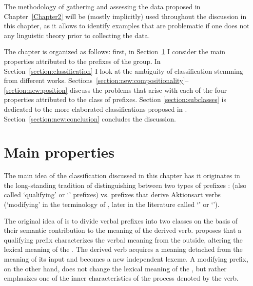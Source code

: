  The methodology of gathering and assessing the data proposed in Chapter~\ref{Chapter2} will be (mostly implicitly) used throughout the discussion in this chapter, as it allows to identify examples that are problematic if one does not  any linguistic theory prior to collecting the data.

The chapter is organized as follows: first, in Section~\ref{section:properties} I consider the main properties attributed to the prefixes of the  group. In Section~\ref{section:classification} I look at the ambiguity of classification stemming from different works. Sections~\ref{section:new:compositionality}--\ref{section:new:position} discuss the problems that arise with each of the four properties attributed to the class of  prefixes. Section \ref{section:subclasses} is dedicated to the more elaborated classifications proposed in \citet{Tatevosov:07,Tatevosov:09}. Section~\ref{section:new:conclusion} concludes the discussion.
\section{Main properties}\label{section:properties}
The main idea of the classification discussed in this chapter has it originates in the long-standing tradition of distinguishing between two types of prefixes \citep{Isachenko:60, Forsyth:70, Townsend:75}:  (also called `qualifying' or `' prefixes) vs. prefixes that derive Aktionsart verbs (`modifying' in the terminology of \citeauthor{Isachenko:60}, later in the literature called `' or `').

The original idea of \citet[222--224]{Isachenko:60} is to divide verbal prefixes into two classes on the basis of their semantic contribution to the meaning of the derived verb. \citeauthor{Isachenko:60} proposes that a qualifying prefix characterizes the verbal meaning from the outside, altering the lexical meaning of the . The derived verb acquires a meaning detached from the meaning of its input and becomes a new independent lexeme. A modifying prefix, on the other hand, does not change the lexical meaning of the , but rather emphasizes one of the inner characteristics of the process denoted by the  verb.

